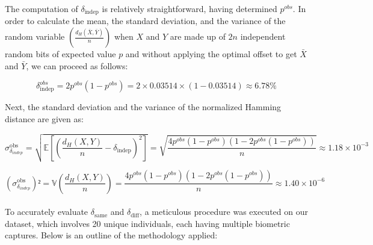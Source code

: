 The computation of \( \delta_{\text{indep}} \) is relatively straightforward, having determined \( p^{obs} \). In order to calculate the mean, the standard deviation, and the variance of the random variable \(\left( \frac{d_H(\bar{X}, \bar{Y})}{n} \right)\) when \(X\) and \(Y\) are made up of \(2n\) independent random bits of expected value \(p\) and without applying the optimal offset to get \(\bar{X}\) and \(\bar{Y}\), we can proceed as follows:

\[ \delta^{obs}_{\text{indep}} = 2p^{obs}(1 - p^{obs}) = 2 \times 0.03514 \times (1 - 0.03514) \approx 6.78\% \]

Next, the standard deviation and the variance of the normalized Hamming distance are given as:

\[ {\sigma^{\text{obs}}_{\delta_{indep}}} = \sqrt{\mathbb{E} \left[ \left( \frac{d_H(X, Y)}{n} - \delta_{\text{indep}} \right)^2 \right]} = \sqrt{\frac{4p^{obs}(1 - p^{obs})(1 - 2p^{obs}(1 - p^{obs}))}{n}} \approx 1.18 \times 10^{-3} \]

\[ ({\sigma^{\text{obs}}_{\delta_{indep}}})² = \mathbb{V}\left( \frac{d_H(X, Y)}{n} \right) = \frac{4p^{obs}(1 - p^{obs})(1 - 2p^{obs}(1 - p^{obs}))}{n} \approx 1.40 \times 10^{-6} \]\\

To accurately evaluate \( \delta_{\text{same}} \) and \( \delta_{\text{diff}} \), a meticulous procedure was executed on our dataset, which involves 20 unique individuals, each having multiple biometric captures. Below is an outline of the methodology applied:

